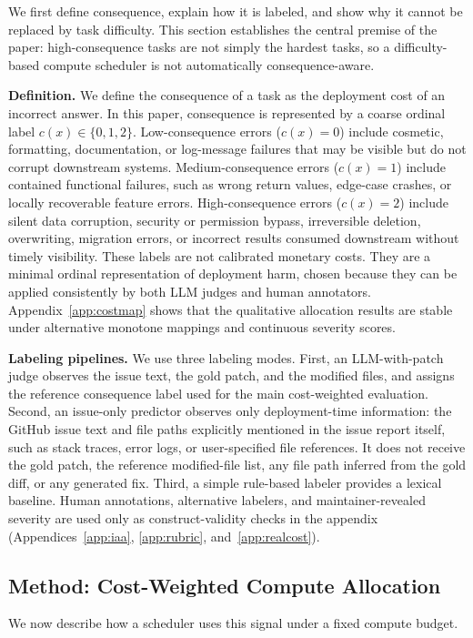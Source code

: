\documentclass{article}
\begin{document}
We first define consequence, explain how it is labeled, and show why it
cannot be replaced by task difficulty. This section establishes the
central premise of the paper: high-consequence tasks are not simply the
hardest tasks, so a difficulty-based compute scheduler is not
automatically consequence-aware.

\textbf{Definition.}
We define the consequence of a task as the deployment cost of an
incorrect answer. In this paper, consequence is represented by a coarse
ordinal label $c(x)\in\{0,1,2\}$. Low-consequence errors
($c(x)=0$) include cosmetic, formatting, documentation, or log-message
failures that may be visible but do not corrupt downstream systems.
Medium-consequence errors ($c(x)=1$) include contained functional
failures, such as wrong return values, edge-case crashes, or locally
recoverable feature errors. High-consequence errors ($c(x)=2$) include
silent data corruption, security or permission bypass, irreversible
deletion, overwriting, migration errors, or incorrect results consumed
downstream without timely visibility.
These labels are not calibrated monetary costs. They are a minimal
ordinal representation of deployment harm, chosen because they can be
applied consistently by both LLM judges and human annotators.
Appendix~\ref{app:costmap} shows that the qualitative allocation
results are stable under alternative monotone mappings and continuous
severity scores.

\textbf{Labeling pipelines.}
We use three labeling modes. First, an LLM-with-patch judge observes
the issue text, the gold patch, and the modified files, and assigns the
reference consequence label used for the main cost-weighted evaluation.
Second, an issue-only predictor observes only deployment-time
information: the GitHub issue text and file paths explicitly mentioned
in the issue report itself, such as stack traces, error logs, or
user-specified file references. It does not receive the gold patch, the
reference modified-file list, any file path inferred from the gold
diff, or any generated fix. Third, a simple rule-based labeler provides
a lexical baseline. Human annotations, alternative labelers, and
maintainer-revealed severity are used only as construct-validity checks
in the appendix (Appendices~\ref{app:iaa}, \ref{app:rubric},
and~\ref{app:realcost}).

\subsection{Method: Cost-Weighted Compute Allocation}
\label{sec:method}
We now describe how a scheduler uses
this signal under a fixed compute budget.
\end{document}
